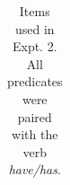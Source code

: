 \documentclass[floatsintext,doc]{apa6}
\begin{document}
\begin{longtable}{ |p{3in}| |p{2 in}|}
\caption{Items used in Expt. 2. All predicates were paired with the verb \emph{have/has}.} 
\end{longtable}

\endgroup




\newpage
\end{document}
